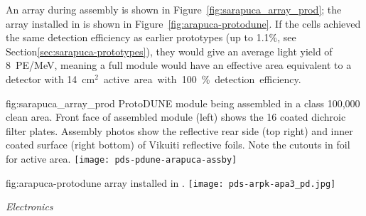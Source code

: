 An  array during assembly is shown in Figure~\ref{fig:sarapuca_array_prod}; the array installed in  is shown in Figure~\ref{fig:arapuca-protodune}. If the  cells achieved the same detection efficiency as earlier prototypes (up to 1.1\%, see Section\ref{sec:sarapuca-prototypes}), they would give an average light yield of \SI{8}{PE/MeV}, meaning a full  module would have an effective area equivalent to a detector with \SI{14}{cm$^2$} active area with 100\% detection efficiency.



\begin{dunefigure}{fig:sarapuca_array_prod}
{ProtoDUNE  module being assembled in a class 100,000 clean area.  Front face of assembled module (left) shows the 16 coated dichroic filter plates.  Assembly photos show the reflective rear side (top right) and inner coated surface (right bottom) of Vikuiti reflective foils.  Note the cutouts in foil for  active area.}
	\texttt{[image: pds-pdune-arapuca-assby]}
\end{dunefigure}


\begin{dunefigure}{fig:arapuca-protodune}
{ array installed in .} 
\texttt{[image: pds-arpk-apa3\_pd.jpg]} 
\end{dunefigure}


\textit{ Electronics}
\label{sec:ssp-protodune-electronics}


